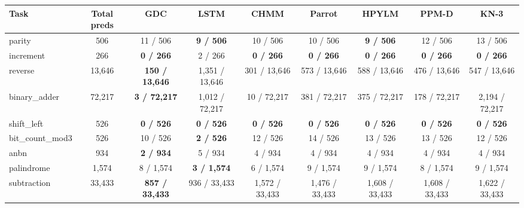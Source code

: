 \begin{table}[t]
{\begin{tabular}{l c c c c c c c c}
\toprule
Task & Total preds & GDC & LSTM & CHMM & Parrot & HPYLM & PPM-D & KN-3 \\
\midrule
parity         & 506      & 11 / 506               & \textbf{9 / 506}      & 10 / 506              & 10 / 506              & \textbf{9 / 506}      & 12 / 506              & 13 / 506              \\
increment      & 266      & \textbf{0 / 266}       & 2 / 266               & \textbf{0 / 266}      & \textbf{0 / 266}      & \textbf{0 / 266}      & \textbf{0 / 266}      & \textbf{0 / 266}      \\
reverse        & 13{,}646 & \textbf{150 / 13{,}646} & 1{,}351 / 13{,}646    & 301 / 13{,}646        & 573 / 13{,}646        & 588 / 13{,}646        & 476 / 13{,}646        & 547 / 13{,}646        \\
binary\_adder  & 72{,}217 & \textbf{3 / 72{,}217}  & 1{,}012 / 72{,}217    & 10 / 72{,}217         & 381 / 72{,}217        & 375 / 72{,}217        & 178 / 72{,}217        & 2{,}194 / 72{,}217   \\
shift\_left    & 526      & \textbf{0 / 526}       & \textbf{0 / 526}      & \textbf{0 / 526}      & \textbf{0 / 526}      & \textbf{0 / 526}      & \textbf{0 / 526}      & \textbf{0 / 526}      \\
bit\_count\_mod3 & 526    & 10 / 526               & \textbf{2 / 526}      & 12 / 526              & 14 / 526              & 13 / 526              & 13 / 526              & 12 / 526              \\
anbn           & 934      & \textbf{2 / 934}       & 5 / 934               & 4 / 934               & 4 / 934               & 4 / 934               & 4 / 934               & 4 / 934               \\
palindrome     & 1{,}574  & 8 / 1{,}574            & \textbf{3 / 1{,}574}  & 6 / 1{,}574           & 9 / 1{,}574           & 9 / 1{,}574           & 8 / 1{,}574           & 9 / 1{,}574           \\
subtraction    & 33{,}433 & \textbf{857 / 33{,}433}& 936 / 33{,}433        & 1{,}572 / 33{,}433    & 1{,}476 / 33{,}433    & 1{,}608 / 33{,}433    & 1{,}608 / 33{,}433    & 1{,}622 / 33{,}433    \\
\bottomrule
\end{tabular}}
\end{table}


